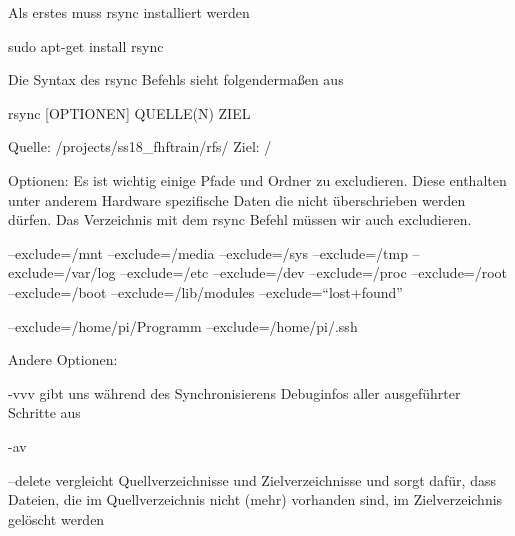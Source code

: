 \documentclass[a4paper,10pt] {article}
\begin{document}
			Als erstes muss rsync installiert werden
			
			sudo apt-get install rsync 
			
			Die Syntax des rsync Befehls sieht folgendermaßen aus
			
			rsync [OPTIONEN] QUELLE(N) ZIEL 
			
			Quelle: /projects/ss18\_fhftrain/rfs/
			Ziel: /
			
			Optionen:
			Es ist wichtig einige Pfade und Ordner zu excludieren. Diese enthalten unter anderem Hardware spezifische Daten die nicht überschrieben werden dürfen. Das Verzeichnis mit dem rsync Befehl müssen wir auch excludieren. 
			
			--exclude=/mnt 
			--exclude=/media 
			--exclude=/sys 
			--exclude=/tmp 
			--exclude=/var/log 
			--exclude=/etc 
			--exclude=/dev 
			--exclude=/proc 
			--exclude=/root 
			--exclude=/boot 
			--exclude=/lib/modules 
			--exclude=``lost+found''
			
			--exclude=/home/pi/Programm 
			--exclude=/home/pi/.ssh 
			
			Andere Optionen:
			
			-vvv
			gibt uns während des Synchronisierens Debuginfos aller ausgeführter Schritte aus 
			
			-av
			
			--delete
			vergleicht Quellverzeichnisse und Zielverzeichnisse und sorgt dafür, dass Dateien, die im Quellverzeichnis nicht (mehr) vorhanden sind, im Zielverzeichnis gelöscht werden			
		
		\vfill
		
\newpage
\end{document}
